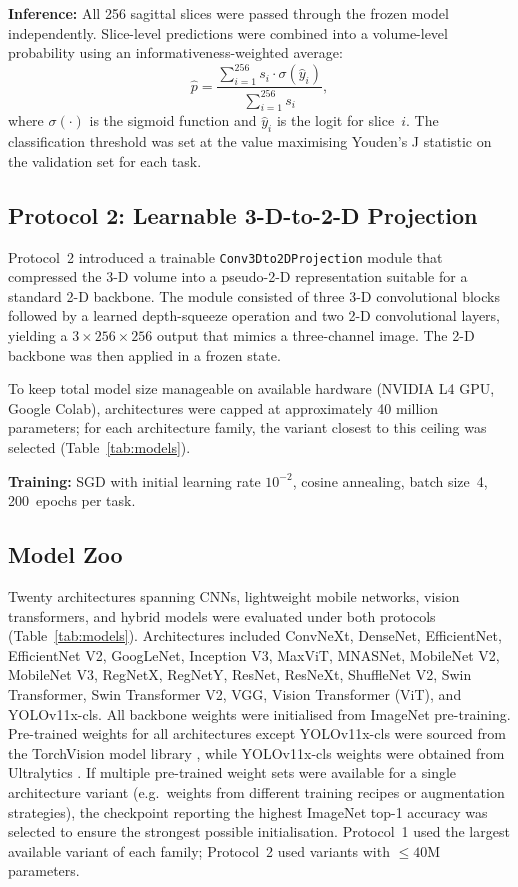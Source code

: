 \documentclass[review,12pt]{elsarticle}
\begin{document}
\textbf{Inference:} All 256 sagittal slices were passed through the
frozen model independently. Slice-level predictions were combined into
a volume-level probability using an informativeness-weighted average:
\begin{equation}
  \hat{p} = \frac{\sum_{i=1}^{256} s_i \cdot \sigma(\hat{y}_i)}
                 {\sum_{i=1}^{256} s_i},
  \label{eq:agg}
\end{equation}
where $\sigma(\cdot)$ is the sigmoid function and $\hat{y}_i$ is the
logit for slice~$i$. The classification threshold was set at the value
maximising Youden's J statistic on the validation set for each task.

\subsection{Protocol 2: Learnable 3-D-to-2-D Projection}
\label{sec:proto2}

Protocol~2 introduced a trainable \texttt{Conv3Dto2DProjection} module
that compressed the 3-D volume into a pseudo-2-D representation suitable
for a standard 2-D backbone. The module consisted of three 3-D
convolutional blocks followed by a learned depth-squeeze operation and
two 2-D convolutional layers, yielding a $3 \times 256 \times 256$
output that mimics a three-channel image. The 2-D backbone was then
applied in a frozen state.

To keep total model size manageable on available hardware (NVIDIA L4 GPU,
Google Colab), architectures were capped at approximately 40 million
parameters; for each architecture family, the variant closest to this
ceiling was selected (Table~\ref{tab:models}).

\textbf{Training:} SGD with initial learning rate $10^{-2}$, cosine
annealing, batch size~4, 200~epochs per task.

\subsection{Model Zoo}
\label{sec:models}

Twenty architectures spanning CNNs, lightweight mobile networks,
vision transformers, and hybrid models were evaluated under both
protocols (Table~\ref{tab:models}). Architectures included ConvNeXt,
DenseNet, EfficientNet, EfficientNet V2, GoogLeNet, Inception V3,
MaxViT, MNASNet, MobileNet V2, MobileNet V3, RegNetX, RegNetY, ResNet,
ResNeXt, ShuffleNet V2, Swin Transformer, Swin Transformer V2, VGG,
Vision Transformer (ViT), and YOLOv11x-cls. All backbone weights were initialised from ImageNet pre-training. Pre-trained weights for all architectures except YOLOv11x-cls were sourced from the TorchVision model library \cite{TorchVision}, while YOLOv11x-cls weights were obtained from Ultralytics \cite{yolo11_ultralytics}. If multiple pre-trained weight sets were available for a single architecture variant (e.g.\ weights from different training recipes or augmentation strategies), the checkpoint reporting the highest ImageNet top-1 accuracy was selected to ensure the strongest possible initialisation. Protocol~1 used the largest available variant of each family; Protocol~2 used variants with $\leq 40\text{M}$ parameters.
\end{document}
